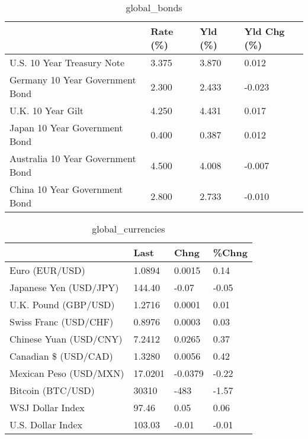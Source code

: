 \documentclass{article}%
\begin{document}
%


\begin{table}[htbp]%
\caption{global\_bonds}%
\centering%
\begin{adjustbox}{width=1\textwidth}%
\begin{tabular}{llll}
\toprule
                                  & Rate (\%) & Yld (\%) & Yld Chg (\%) \\
\midrule
       U.S. 10 Year Treasury Note &    3.375 &   3.870 &       0.012 \\
  Germany 10 Year Government Bond &    2.300 &   2.433 &      -0.023 \\
                U.K. 10 Year Gilt &    4.250 &   4.431 &       0.017 \\
    Japan 10 Year Government Bond &    0.400 &   0.387 &       0.012 \\
Australia 10 Year Government Bond &    4.500 &   4.008 &      -0.007 \\
    China 10 Year Government Bond &    2.800 &   2.733 &      -0.010 \\
\bottomrule
\end{tabular}
%
\end{adjustbox}%
\end{table}

%


\begin{table}[htbp]%
\caption{global\_currencies}%
\centering%
\begin{adjustbox}{width=1\textwidth}%
\begin{tabular}{llll}
\toprule
                       &    Last &    Chng & \%Chng \\
\midrule
        Euro (EUR/USD) &  1.0894 &  0.0015 &  0.14 \\
Japanese Yen (USD/JPY) &  144.40 &   -0.07 & -0.05 \\
  U.K. Pound (GBP/USD) &  1.2716 &  0.0001 &  0.01 \\
 Swiss Franc (USD/CHF) &  0.8976 &  0.0003 &  0.03 \\
Chinese Yuan (USD/CNY) &  7.2412 &  0.0265 &  0.37 \\
  Canadian \$ (USD/CAD) &  1.3280 &  0.0056 &  0.42 \\
Mexican Peso (USD/MXN) & 17.0201 & -0.0379 & -0.22 \\
     Bitcoin (BTC/USD) &   30310 &    -483 & -1.57 \\
      WSJ Dollar Index &   97.46 &    0.05 &  0.06 \\
     U.S. Dollar Index &  103.03 &   -0.01 & -0.01 \\
\bottomrule
\end{tabular}
%
\end{adjustbox}%
\end{table}
\end{document}
